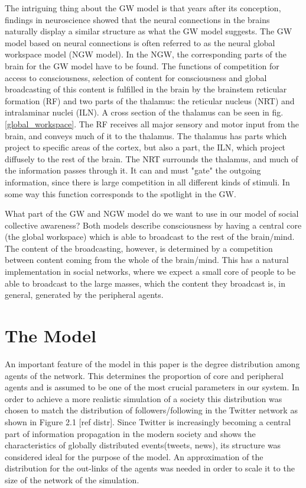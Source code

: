 \documentclass [12pt,a4paper,twoside]{article}
\begin{document}
The intriguing thing about the GW model is that years after its conception, findings in neuroscience showed that the neural connections in the brains naturally display a similar structure as what the GW model suggests. The GW model based on neural connections is often referred to as the neural global workspace model (NGW model). In the NGW, the corresponding parts of the brain for the GW model have to be found. The functions of competition for access to consciousness, selection of content for consciousness and global broadcasting of this content is fulfilled in the brain by the brainstem reticular formation (RF) and two parts of the thalamus: the reticular nucleus (NRT) and intralaminar nuclei (ILN). A cross section of the thalamus can be seen in fig. \ref{global_workspace}. The RF receives all major sensory and motor input from the brain, and conveys much of it to the thalamus. The thalamus has parts which project to specific areas of the cortex, but also a part, the ILN, which project diffusely to the rest of the brain. The NRT surrounds the thalamus, and much of the information passes through it. It can and must "gate" the outgoing information, since there is large competition in all different kinds of stimuli. In some way this function corresponds to the spotlight in the GW. \cite{lecture-notes}

What part of the GW and NGW model do we want to use in our model of social collective awareness? Both models describe consciousness by having a central core (the global workspace) which is able to broadcast to the rest of the brain/mind. The content of the broadcasting, however, is determined by a competition between content coming from the whole of the brain/mind. This has a natural implementation in social networks, where we expect a small core of people to be able to broadcast to the large masses, which the content they broadcast is, in general, generated by the peripheral agents.


\section{The Model}
An important feature of the model in this paper is the degree distribution among agents of the network. This determines the proportion of core and peripheral agents and is assumed to be one of the most crucial parameters in our system. In order to achieve a more realistic simulation of a society this distribution was chosen to match the distribution of followers/following in the Twitter network as shown in Figure 2.1 [ref distr]. Since Twitter is increasingly becoming a central part of information propagation in the modern society and shows the characteristics of globally distributed events(tweets, news), its structure was considered ideal for the purpose of the model. An approximation of the distribution for the out-links of the agents was needed in order to scale it to the size of the network of the simulation.
\end{document}

